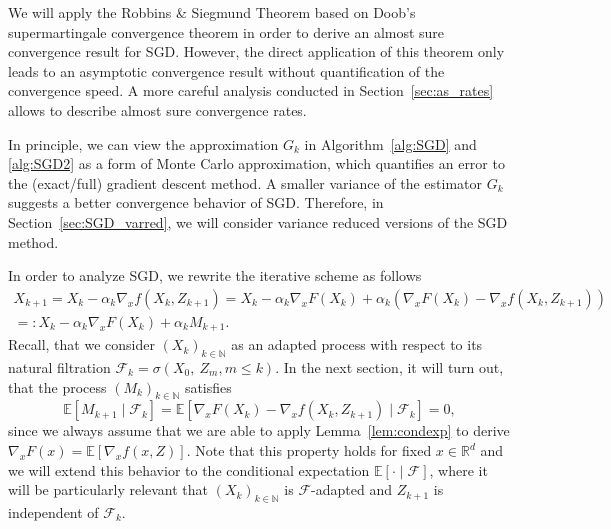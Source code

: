 \documentclass[12pt,openany]{book}
\theoremstyle{definition}
\theoremstyle{definition}
\newcommand{\E}{\mathbb{E}}
\newcommand{\N}{\mathbb{N}}
\newcommand{\R}{\mathbb{R}}
\begin{document}
We will apply the Robbins \& Siegmund Theorem based on Doob's supermartingale convergence theorem in order to derive an almost sure convergence result for SGD. However, the direct application of this theorem only leads to an asymptotic convergence result without quantification of the convergence speed. A more careful analysis conducted in Section~\ref{sec:as_rates} allows to describe almost sure convergence rates.

In principle, we can view the approximation $G_k$ in Algorithm~\ref{alg:SGD} and \ref{alg:SGD2} as a form of Monte Carlo approximation, which quantifies an error to the (exact/full) gradient descent method. A smaller variance of the estimator $G_k$ suggests a better convergence behavior of SGD. Therefore, in Section~\ref{sec:SGD_varred}, we will consider variance reduced versions of the SGD method.

In order to analyze SGD, we rewrite the iterative scheme as follows
\begin{align*}
X_{k+1} = X_k -\alpha_k \nabla_x f(X_k,Z_{k+1}) = X_k - \alpha_k\nabla_x F(X_k) + \alpha_k \left(\nabla_x F(X_k) - \nabla_x f(X_k,Z_{k+1})\right)\\
=:  X_k - \alpha_k\nabla_x F(X_k) + \alpha_k M_{k+1}.
\end{align*}
Recall, that we consider $(X_k)_{k\in\N}$ as an adapted process with respect to its natural filtration
$\mathcal F_k = \sigma(X_0,\ Z_m,m\le k)$. In the next section, it will turn out, that the  process $(M_k)_{k\in\N}$ satisfies
\begin{equation}\label{eq:unbiased_filtration}
\E[M_{k+1}\mid \mathcal F_k] = \E[\nabla_x F(X_k) - \nabla_x f(X_k,Z_{k+1})\mid \mathcal F_k] = 0,
\end{equation}
since we always assume that we are able to apply Lemma~\ref{lem:condexp} to derive $\nabla_x F(x) = \E[ \nabla_x f(x,Z)]$. Note that this property holds for fixed $x\in\R^d$ and we will extend this behavior to the conditional expectation $\E[ \cdot \mid \mathcal F]$, where it will be particularly relevant that $(X_k)_{k\in\N}$ is $\mathcal F$-adapted and $Z_{k+1}$ is independent of $\mathcal F_k$. 
\end{document}
